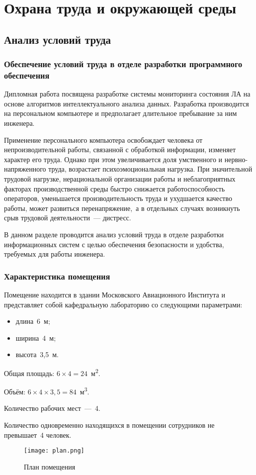 \chapter{Охрана труда и окружающей среды}
\section{Анализ условий труда}
\subsection{Обеспечение условий труда в отделе разработки программного обеспечения}
Дипломная работа посвящена разработке системы мониторинга состояния ЛА на основе алгоритмов интеллектуального анализа данных. Разработка производится на персональном компьютере и предполагает длительное пребывание за ним инженера.

Применение персонального компьютера освобождает человека от непроизводительной работы, связанной с обработкой информации, изменяет характер его труда. Однако при этом увеличивается доля умственного и нервно-напряженного труда, возрастает психоэмоциональная нагрузка. При значительной трудовой нагрузке, нерациональной организации работы и неблагоприятных факторах производственной среды быстро снижается работоспособность операторов, уменьшается производительность труда и ухудшается качество работы, может развиться перенапряжение,~а в отдельных случаях возникнуть срыв трудовой деятельности~— дистресс.

В данном разделе проводится анализ условий труда в отделе разработки информационных систем с целью обеспечения безопасности и удобства, требуемых для работы инженера.

\subsection{Характеристика помещения}
Помещение находится в здании Московского Авиационного Института и представляет собой кафедральную лабораторию со следующими параметрами:
\begin{itemize}
\item длина~6~м;
\item ширина~4~м;
\item высота~3,5~м.
\end{itemize}

Общая площадь: $6\times4 = 24$~м\textsuperscript{2}.

Объём: $6\times4\times3,5 = 84$~м\textsuperscript{3}.

Количество рабочих мест~—~4.

Количество одновременно находящихся в помещении сотрудников не превышает~4 человек.

\begin{figure}
\texttt{[image: plan.png]}
\caption{План помещения}\label{room_plan}
\end{figure}
